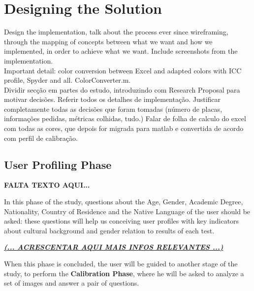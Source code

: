 \section{Designing the Solution}
\label{sec:impl_designingsolution}
Design the implementation, talk about the process ever since wireframing, through the mapping of concepts between
what we want and how we implemented, in order to achieve what we want. Include screenshots from the implementation. \\

Important detail: color conversion between Excel and adapted colors with ICC profile, Spyder and all. ColorConverter.m. \\
%
Dividir secção em partes do estudo, introduzindo com Research Proposal para motivar decisões. Referir todos os detalhes de implementação.
Justificar completamente todas as decisões que foram tomadas (número de placas, informações pedidas, métricas colhidas, tudo.)
%
Falar de folha de calculo do excel com todas as cores, que depois for migrada para matlab
e convertida de acordo com perfil de calibração.
%
\subsection{User Profiling Phase}
\label{subsec:design_profiling}
%
\textbf{FALTA TEXTO AQUI...} \par
%
In this phase of the study, questions about the Age, Gender, Academic Degree, Nationality, Country of Residence and the Native Language of the user should be asked: these questions will help us conceiving user profiles with key indicators about cultural background and gender relation to results of each test. \par
%
\textbf{\underline{\emph{(... ACRESCENTAR AQUI MAIS INFOS RELEVANTES ...)}}} \par
%
When this phase is concluded, the user will be guided to another stage of the study, to perform the \textbf{Calibration Phase}, where he will be asked to analyze a set of images and answer a pair of questions. \par
%

